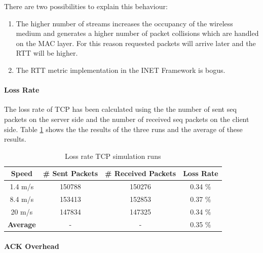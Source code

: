 \documentclass[a4paper]{article}
\begin{document}
There are two possibilities to explain this behaviour:
\begin{enumerate}
	\item The higher number of streams increases the occupancy of the wireless medium and generates a higher number of packet collisions which are handled on the MAC layer. For this reason requested packets will arrive later and the RTT will be higher.
	\item The RTT metric implementation in the INET Framework is bogus.
\end{enumerate}

\paragraph{Loss Rate}

The loss rate of TCP has been calculated using the the number of sent seq packets on the server side and the number of received seq packets on the client side.
Table \ref{table:loss-rate-tcp} shows the the results of the three runs and the average of these results.
\begin{table}[H]
\centering
\begin{tabular}{cccc}

\textbf{Speed} & \textbf{\# Sent Packets} & \textbf{\# Received Packets} & \textbf{Loss Rate} \\ 
\hline 
\hline
1.4 m/s & 150788 & 150276 & 0.34 \% \\ 

8.4 m/s & 153413 & 152853 & 0.37 \% \\ 

20 m/s & 147834 & 147325 & 0.34 \% \\ 
 \hline
\textbf{Average} & - & - & 0.35 \% \\ 
\end{tabular} 

\label{table:loss-rate-tcp}
\caption{Loss rate TCP simulation runs}
\end{table}

\paragraph{ACK Overhead}
\end{document}
